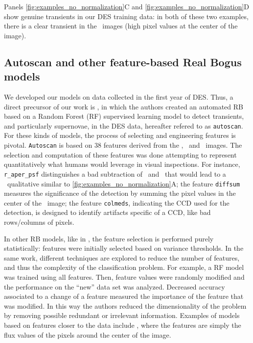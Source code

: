Panels \autoref{fig:examples_no_normalization}C and \autoref{fig:examples_no_normalization}D show genuine transients in our DES training data: in both of these two examples, there is a clear transient in the \diff\  images (high pixel values at the center of the image).

\subsection{Autoscan and other feature-based Real Bogus models}
\label{sec:autoscan}

We developed our models on data collected in the first year of DES. Thus, a direct precursor of our work is \cite{Goldstein_2015}, in which the authors created an automated RB based on a Random Forest (RF) supervised learning model \citep{ho1995random} to detect transients, and particularly supernovae, in the DES data, hereafter refered to as \texttt{autoscan}. For these kinds of models, the process of selecting and engineering features is pivotal. %
\texttt{Autoscan} is based on 38 features derived from the \diff, \search\ and \temp\ images. The selection and computation of these features was done attempting to represent quantitatively what humans would leverage in visual inspections. For instance, \texttt{r\_aper\_psf}  distinguishes a bad subtraction of \search\ and \temp\ that would lead to a \diff\ qualitative similar to  \autoref{fig:examples_no_normalization}A; the feature \texttt{diffsum} measures the significance of the detection by summing the pixel values in the center of the \diff\ image; the feature \texttt{colmeds}, indicating the CCD used for the detection, is designed to identify artifacts specific of a CCD, like bad rows/columns of pixels.


In other RB models, like in \cite{S_nchez_2019},
the feature selection is performed purely statistically: features were initially selected based on variance thresholds. In the same work, different techniques are explored to reduce the number of features, and thus the complexity of the classification problem. For example, a RF model was trained using all features. Then, feature values were randomly modified and the performance on the ``new'' data set was analyzed. Decreased accuracy associated to a change of a feature measured the importance of the feature that was modified. In this way the authors reduced the dimensionality of the problem by removing possible redundant or irrelevant information. Examples of models based on features closer to the data include \cite{Mong_2020}, where the features are simply the flux values of the pixels around the center of the image.




